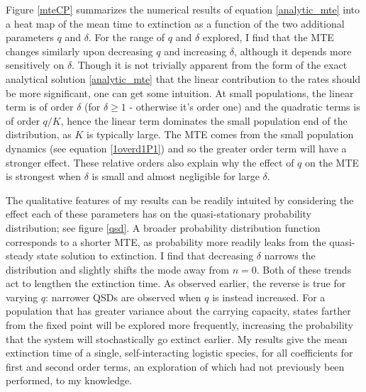 Figure \ref{mteCP} summarizes the numerical results of equation \ref{analytic_mte} into a heat map of the mean time to extinction as a function of the two additional parameters $q$ and $\delta$.
For the range of $q$ and $\delta$ explored, I find that the MTE changes similarly upon decreasing $q$ and increasing $\delta$, although it depends more sensitively on $\delta$. 
Though it is not trivially apparent from the form of the exact analytical solution \ref{analytic_mte} that the linear contribution to the rates should be more significant, one can get some intuition. %
At small populations, the linear term is of order $\delta$ (for $\delta \geq 1$ - otherwise it's order one) and the quadratic terms is of order $q/K$, hence the linear term dominates the small population end of the distribution, as $K$ is typically large. 
The MTE comes from the small population dynamics (see equation \ref{1overd1P1}) and so the greater order term will have a stronger effect. 
These relative orders also explain why the effect of $q$ on the MTE is strongest when $\delta$ is small and almost negligible for large $\delta$. 

The qualitative features of my results can be readily intuited by considering the effect each of these parameters has on the quasi-stationary probability distribution; see figure \ref{qsd}. 
A broader probability distribution function corresponds to a shorter MTE, as probability more readily leaks from the quasi-steady state solution to extinction.
I find that decreasing $\delta$ narrows the distribution and slightly shifts the mode away from $n=0$. 
Both of these trends act to lengthen the extinction time. 
As observed earlier, the reverse is true for varying $q$: narrower QSDs are observed when $q$ is instead increased.
For a population that has greater variance about the carrying capacity, states farther from the fixed point will be explored more frequently, increasing the probability that the system will stochastically go extinct earlier. 
My results give the mean extinction time of a single, self-interacting logistic species, for all coefficients for first and second order terms, an exploration of which had not previously been performed, to my knowledge. 

